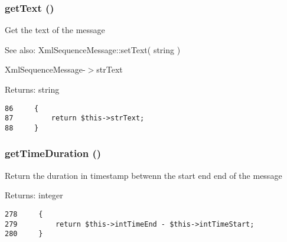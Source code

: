 \hypertarget{class_xml_sequence_message_8a2999b1d846c0a7bc77187e28facd99}{
\subsubsection[{getText}]{\setlength{\rightskip}{0pt plus 5cm}getText ()}}
\label{class_xml_sequence_message_8a2999b1d846c0a7bc77187e28facd99}


Get the text of the message

\begin{Desc}
\item[See also:]XmlSequenceMessage::setText( string ) 

XmlSequenceMessage-$>$strText \end{Desc}
\begin{Desc}
\item[Returns:]string \end{Desc}


\begin{Code}\begin{verbatim}86     {
87         return $this->strText;
88     }
\end{verbatim}
\end{Code}


\hypertarget{class_xml_sequence_message_9c044f30dde50e09fa8e7e916fba8a3f}{
\subsubsection[{getTimeDuration}]{\setlength{\rightskip}{0pt plus 5cm}getTimeDuration ()}}
\label{class_xml_sequence_message_9c044f30dde50e09fa8e7e916fba8a3f}


Return the duration in timestamp betwenn the start end end of the message

\begin{Desc}
\item[Returns:]integer \end{Desc}


\begin{Code}\begin{verbatim}278     {
279         return $this->intTimeEnd - $this->intTimeStart;
280     }
\end{verbatim}
\end{Code}


